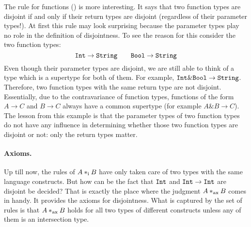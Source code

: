 The rule for functions () is more interesting. It says that two function
types are disjoint if and only if their return types are disjoint (regardless of
their parameter types!). At first this rule may look surprising
because the parameter types play no role in the definition of
disjointness. To see the reason for this consider the two function types:
\[ \texttt{Int} \to \texttt{String} \qquad \texttt{Bool} \to \texttt{String} \]
Even though their parameter types are disjoint, we are still able to think of a
type which is a supertype for both of them. For example, $ \texttt{Int} \& \texttt{Bool}
\to \texttt{String} $. Therefore, two function types with
the same return type are not
disjoint. Essentially, due to the contravariance of function types,
functions of the form $A \to C$ and $B \to C$ always have a common
supertype (for example $A \& B \to C$).
The lesson from this example is that the parameter types of two
function types do not have any influence in determining whether those two function
types are disjoint or not: only the return types matter.


\paragraph{Axioms.} Up till now, the rules of $ A *_\textnormal{i} B $ have only
taken care of two types with the same language constructs. But how can be the
fact that $\texttt{Int}$ and $\texttt{Int} \to \texttt{Int}$ are disjoint be decided?
That is exactly the place where the judgment $ A *_\textnormal{ax} B $ comes in handy.
It provides the axioms for disjointness. What is captured by the set of rules is
that $ A *_\textnormal{ax} B $ holds for all two types of different constructs unless
any of them is an intersection type.

